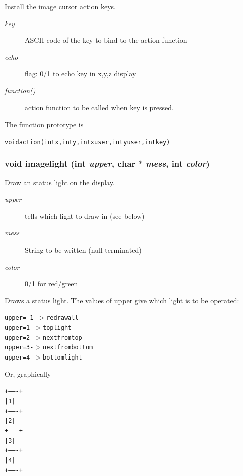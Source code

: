 Install the image cursor action keys. 

\begin{Desc}
\item[Parameters:]
\begin{description}
\item[{\em key}]ASCII code of the key to bind to the action function \item[{\em echo}]flag: 0/1 to echo key in x,y,z display \item[{\em function()}]action function to be called when key is pressed.\end{description}
\end{Desc}
The function prototype is \small\begin{alltt}
  void action(int x, int y, int xuser, int yuser, int key) 
  \end{alltt}\normalsize 
\subsubsection{\setlength{\rightskip}{0pt plus 5cm}void imagelight (int {\em upper}, char $\ast$ {\em mess}, int {\em color})}\label{xtv_8h_a81}


Draw an status light on the display. 

\begin{Desc}
\item[Parameters:]
\begin{description}
\item[{\em upper}]tells which light to draw in (see below) \item[{\em mess}]String to be written (null terminated) \item[{\em color}]0/1 for red/green\end{description}
\end{Desc}
Draws a status light. The values of upper give which light is to be operated: \small\begin{alltt}
  upper = -1 -$>$ redraw all
  upper = 1  -$>$ top light
  upper = 2  -$>$ next from top
  upper = 3  -$>$ next from bottom
  upper = 4  -$>$ bottom light
  \end{alltt}\normalsize 
 Or, graphically \small\begin{alltt}
  +-------+
  |   1   |
  +-------+
  |   2   |
  +-------+
  |   3   |
  +-------+
  |   4   |
  +-------+
  \end{alltt}\normalsize 
